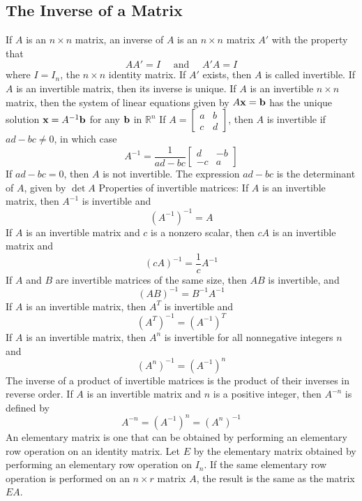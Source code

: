 \documentclass{article}
\begin{document}
   \subsection{The Inverse of a Matrix}
   \begin{outline}
       \1 If $A$ is an \(n\times n\) matrix, an inverse of $A$ is an \(n\times n\) matrix \(A'\) with the property that \[AA'=I\quad\text{ and }\quad A'A=I\]  where \(I=I_n\), the \(n\times n\) identity matrix. If \(A'\) exists, then \(A\) is called invertible. 
       \1 If $A$ is an invertible matrix, then its inverse is unique. 
       \1 If \(A\) is an invertible \(n\times n\) matrix, then the system of linear equations given by \(A\vb x=\vb b\) has the unique solution \(\vb x=A^{-1}\vb b\) for any \(\vb b\) in \(\mathbb R^n\)
       \1 If \(A=\begin{bmatrix}
           a & b\\ c& d
       \end{bmatrix}\), then \(A\) is invertible if \(ad-bc\neq 0\), in which case \[A^{-1}=\dfrac{1}{ad-bc}\begin{bmatrix}
           d & -b \\ -c & a
       \end{bmatrix}\] If \(ad-bc=0\), then \(A\) is not invertible. 
       \1 The expression \(ad-bc\) is the determinant of $A$, given by \(\det A\)
       \1 Properties of invertible matrices: 
            \2 If \(A\) is an invertible matrix, then \(A^{-1}\) is invertible and \[(A^{-1})^{-1}=A\]
            \2 If $A$ is an invertible matrix and $c$ is a nonzero scalar, then \(cA\) is an invertible matrix and \[(cA)^{-1}=\dfrac{1}{c}A^{-1}\]
            \2 If \(A\) and \(B\) are invertible matrices of the same size, then \(AB\) is invertible, and \[(AB)^{-1}=B^{-1}A^{-1}\]
            \2 If \(A\) is an invertible matrix, then \(A^T\) is invertible and \[(A^T)^{-1}=(A^{-1})^T\]
            \2 If $A$ is an invertible matrix, then \(A^n\) is invertible for all nonnegative integers $n$ and \[(A^n)^{-1}=(A^{-1})^n\]
        \1 The inverse of a product of invertible matrices is the product of their inverses in reverse order. 
        \1 If $A$ is an invertible matrix and \(n\) is a positive integer, then \(A^{-n}\) is defined by \[A^{-n}=(A^{-1})^n=(A^n)^{-1}\]
        \1 An elementary matrix is one that can be obtained by performing an elementary row operation on an identity matrix. 
        \1 Let \(E\)  by the elementary matrix obtained by performing an elementary row operation on \(I_n\). If the same elementary row operation is performed on an \(n\times r\) matrix $A$, the result is the same as the matrix \(EA\). 

\end{outline}
\end{document}
